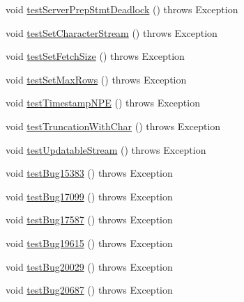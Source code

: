 \begin{DoxyCompactItemize}
\item 
void \mbox{\hyperlink{classtestsuite_1_1regression_1_1_statement_regression_test_ae4419816a2cf52c9d2e3fe03f6965538}{test\+Server\+Prep\+Stmt\+Deadlock}} ()  throws Exception 
\item 
void \mbox{\hyperlink{classtestsuite_1_1regression_1_1_statement_regression_test_a8043401e658d50f132bd6407926ed1f6}{test\+Set\+Character\+Stream}} ()  throws Exception 
\item 
void \mbox{\hyperlink{classtestsuite_1_1regression_1_1_statement_regression_test_a94ba62e42c45e2025b030f3a7f69ea17}{test\+Set\+Fetch\+Size}} ()  throws Exception 
\item 
void \mbox{\hyperlink{classtestsuite_1_1regression_1_1_statement_regression_test_a81fe072b5269fee8c61a3391538282c2}{test\+Set\+Max\+Rows}} ()  throws Exception 
\item 
void \mbox{\hyperlink{classtestsuite_1_1regression_1_1_statement_regression_test_adddbda10c165cfaf7d3ae1266e7a66ab}{test\+Timestamp\+N\+PE}} ()  throws Exception 
\item 
void \mbox{\hyperlink{classtestsuite_1_1regression_1_1_statement_regression_test_aafc5cbe7d1a8aa3033e86c9f0cd8c08a}{test\+Truncation\+With\+Char}} ()  throws Exception 
\item 
void \mbox{\hyperlink{classtestsuite_1_1regression_1_1_statement_regression_test_a7695fd8186a02b78d65dc3af0db02e34}{test\+Updatable\+Stream}} ()  throws Exception 
\item 
void \mbox{\hyperlink{classtestsuite_1_1regression_1_1_statement_regression_test_a8077d99b51217d8479e3637eac582d17}{test\+Bug15383}} ()  throws Exception 
\item 
void \mbox{\hyperlink{classtestsuite_1_1regression_1_1_statement_regression_test_af66916471e845ecaf25d5a2e0e3b67eb}{test\+Bug17099}} ()  throws Exception 
\item 
void \mbox{\hyperlink{classtestsuite_1_1regression_1_1_statement_regression_test_a31f8a70535a902a36164d60c222d0430}{test\+Bug17587}} ()  throws Exception 
\item 
void \mbox{\hyperlink{classtestsuite_1_1regression_1_1_statement_regression_test_a8b65f0d094f2bb8f3e1fc9d4181c956c}{test\+Bug19615}} ()  throws Exception 
\item 
void \mbox{\hyperlink{classtestsuite_1_1regression_1_1_statement_regression_test_abe26694e3066526cd5be755352de286b}{test\+Bug20029}} ()  throws Exception 
\item 
void \mbox{\hyperlink{classtestsuite_1_1regression_1_1_statement_regression_test_a0267fce90c408fe4f218251a41707fdc}{test\+Bug20687}} ()  throws Exception 

\end{DoxyCompactItemize}
